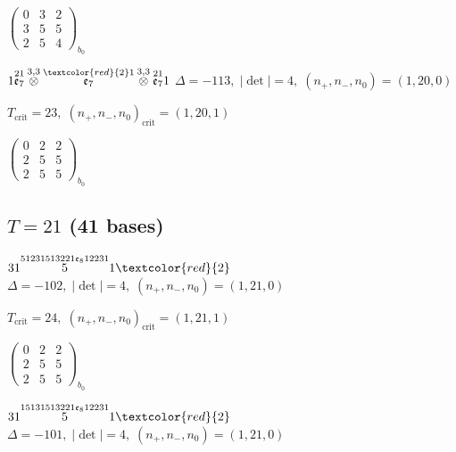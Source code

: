 \documentclass[10pt]{article}
\begin{document}
\hspace{2em}$\left(\begin{smallmatrix}0 & 3 & 2 \\ 3 & 5 & 5 \\ 2 & 5 & 4\end{smallmatrix}\right)_{\!b_0}$

\smallskip

$1\overset{21}{\mathfrak{e}_7}\overset{3,3}{\otimes}\overset{\textcolor{red}{2}1}{\mathfrak{e}_7}\overset{3,3}{\otimes}\overset{21}{\mathfrak{e}_7}1$ \quad $\Delta=-113,\; |\det|=4,\; (n_+,n_-,n_0)=(1,20,0)$

\hspace{1em}$T_{\text{crit}}=23,\; (n_+,n_-,n_0)_{\text{crit}}=(1,20,1)$

\hspace{2em}$\left(\begin{smallmatrix}0 & 2 & 2 \\ 2 & 5 & 5 \\ 2 & 5 & 5\end{smallmatrix}\right)_{\!b_0}$


\subsection*{$T = 21$ \quad (41 bases)}
\smallskip

$31\overset{51231513221\mathfrak{e}_812231}{5}1\textcolor{red}{2}$ \quad $\Delta=-102,\; |\det|=4,\; (n_+,n_-,n_0)=(1,21,0)$

\hspace{1em}$T_{\text{crit}}=24,\; (n_+,n_-,n_0)_{\text{crit}}=(1,21,1)$

\hspace{2em}$\left(\begin{smallmatrix}0 & 2 & 2 \\ 2 & 5 & 5 \\ 2 & 5 & 5\end{smallmatrix}\right)_{\!b_0}$

\smallskip

$31\overset{15131513221\mathfrak{e}_812231}{5}1\textcolor{red}{2}$ \quad $\Delta=-101,\; |\det|=4,\; (n_+,n_-,n_0)=(1,21,0)$
\end{document}
